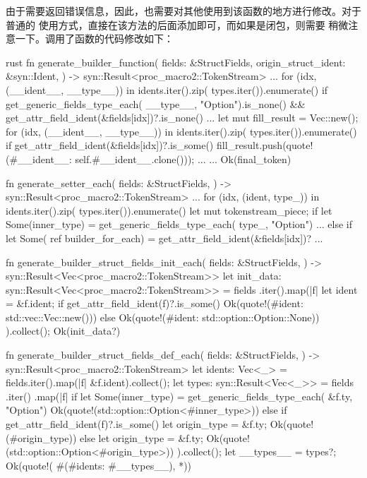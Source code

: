 由于需要返回错误信息，因此，也需要对其他使用到该函数的地方进行修改。对于普通的
使用方式，直接在该方法的后面添加即可，而如果是闭包，则需要
稍微注意一下。调用了函数的代码修改如下：
\begin{code-block}{rust}
fn generate_builder_function(
    fields: &StructFields,
    origin_struct_ident: &syn::Ident,
) -> syn::Result<proc_macro2::TokenStream> {
    ...
    for (idx, (__ident__, __type__)) in idents.iter().zip(
        types.iter()).enumerate() {
        if get_generic_fields_type_each(
            __type__, "Option").is_none()
            && get_attr_field_ident(&fields[idx])?.is_none()
        ...
    }
    let mut fill_result = Vec::new();
    for (idx, (__ident__, __type__)) in idents.iter().zip(
        types.iter()).enumerate() {
        if get_attr_field_ident(&fields[idx])?.is_some() {
            fill_result.push(quote!(#__ident__: self.#__ident__.clone()));
        }
        ...
    }
    ...
    Ok(final_token)
}

fn generate_setter_each(
    fields: &StructFields,
) -> syn::Result<proc_macro2::TokenStream> {
    ...
    for (idx, (ident, type_)) in idents.iter().zip(
        types.iter()).enumerate() {
        let mut tokenstream_piece;
        if let Some(inner_type) = get_generic_fields_type_each(
            type_, "Option") {
            ...
        } else if let Some(
            ref builder_for_each) = get_attr_field_ident(&fields[idx])? {
            ...
        }
    }
}

fn generate_builder_struct_fields_init_each(
    fields: &StructFields,
) -> syn::Result<Vec<proc_macro2::TokenStream>> {
    let init_data: syn::Result<Vec<proc_macro2::TokenStream>> = fields
        .iter().map(|f| {
            let ident = &f.ident;
            if get_attr_field_ident(f)?.is_some() {
                Ok(quote!(#ident: std::vec::Vec::new()))
            } else {
                Ok(quote!(#ident: std::option::Option::None))
            }
        }).collect();
    Ok(init_data?)
}

fn generate_builder_struct_fields_def_each(
    fields: &StructFields,
) -> syn::Result<proc_macro2::TokenStream> {
    let idents: Vec<_> = fields.iter().map(|f| &f.ident).collect();
    let types: syn::Result<Vec<_>> = fields
        .iter()
        .map(|f| {
            if let Some(inner_type) = get_generic_fields_type_each(
                &f.ty, "Option") {
                Ok(quote!(std::option::Option<#inner_type>))
            } else if get_attr_field_ident(f)?.is_some() {
                let origin_type = &f.ty;
                Ok(quote!(#origin_type))
            } else {
                let origin_type = &f.ty;
                Ok(quote!(std::option::Option<#origin_type>))
            }
        }).collect();
    let __types__ = types?;
    Ok(quote!( #(#idents: #__types__), *))
}
\end{code-block}
